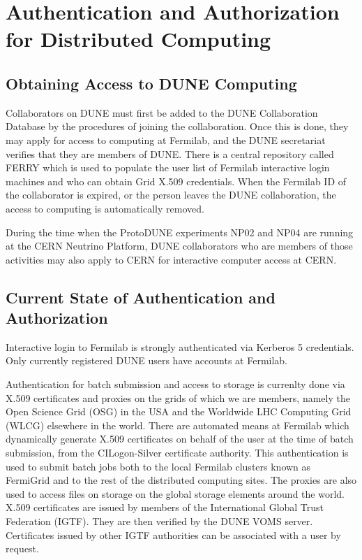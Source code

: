 \documentclass[../main-v1.tex]{subfiles}
\begin{document}
\chapter{Authentication and Authorization for Distributed Computing}
\label{ch:auth}

\section{Obtaining Access to DUNE Computing}
\label{sec:auth:access}
Collaborators on DUNE must first be added to the DUNE Collaboration Database by the procedures of joining the collaboration.
Once this is done, they may apply for access to computing at Fermilab, and the DUNE secretariat verifies that they
are members of DUNE.  There is a central repository called FERRY which is used to populate the user list of
Fermilab interactive login machines and who can obtain Grid X.509 credentials.
 When the Fermilab ID of the collaborator is expired, or the person leaves the DUNE collaboration, the access to computing is automatically removed.
 
 During the time when the ProtoDUNE experiments NP02 and NP04 are running at the CERN Neutrino Platform, DUNE collaborators who are members of those activities may also apply to CERN for interactive computer access at CERN.

\section{Current State of Authentication and Authorization}
Interactive login to Fermilab is strongly authenticated via Kerberos 5 credentials.  Only currently registered DUNE
users have accounts at Fermilab.

Authentication for batch submission and access to storage is currenlty done via X.509 certificates and proxies
on the grids of which we are members, namely the Open Science Grid (OSG) in the USA and the Worldwide LHC 
Computing Grid (WLCG) elsewhere in the world.  There are automated means at Fermilab which dynamically generate 
X.509 certificates on behalf of the user at the time of batch submission, from the CILogon-Silver 
certificate authority. This authentication is used to submit batch jobs both to the local
Fermilab clusters known as FermiGrid and to the rest of the distributed computing sites.  The proxies are
also used to access files on storage on the global storage elements around the world.  
X.509 certificates are issued by members of the International Global Trust Federation (IGTF).  They are then verified 
by the DUNE VOMS server.  Certificates issued by other IGTF authorities can be associated with a user by request.
\end{document}
